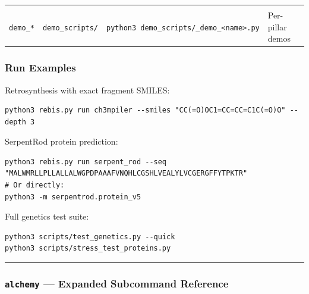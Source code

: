 \documentclass[12pt,a4paper]{article}
\begin{document}
\begin{longtable}[]{@{}llll@{}}
\begin{minipage}[t]{0.28\columnwidth}
\end{minipage}\tabularnewline
\begin{minipage}[t]{0.17\columnwidth}\raggedright
\texttt{demo\_*}\strut
\end{minipage} & \begin{minipage}[t]{0.24\columnwidth}\raggedright
\texttt{demo\_scripts/}\strut
\end{minipage} & \begin{minipage}[t]{0.19\columnwidth}\raggedright
\texttt{python3\ demo\_scripts/\_demo\_\textless{}name\textgreater{}.py}\strut
\end{minipage} & \begin{minipage}[t]{0.28\columnwidth}\raggedright
Per-pillar demos\strut
\end{minipage}\tabularnewline
\bottomrule
\end{longtable}

\hypertarget{run-examples}{%
\subsubsection{Run Examples}\label{run-examples}}

Retrosynthesis with exact fragment SMILES:

\begin{verbatim}
python3 rebis.py run ch3mpiler --smiles "CC(=O)OC1=CC=CC=C1C(=O)O" --depth 3
\end{verbatim}

SerpentRod protein prediction:

\begin{verbatim}
python3 rebis.py run serpent_rod --seq "MALWMRLLPLLALLALWGPDPAAAFVNQHLCGSHLVEALYLVCGERGFFYTPKTR"
# Or directly:
python3 -m serpentrod.protein_v5
\end{verbatim}

Full genetics test suite:

\begin{verbatim}
python3 scripts/test_genetics.py --quick
python3 scripts/stress_test_proteins.py
\end{verbatim}

\begin{center}\rule{0.5\linewidth}{0.5pt}\end{center}

\hypertarget{alchemy-expanded-subcommand-reference}{%
\subsubsection{\texorpdfstring{\texttt{alchemy} --- Expanded Subcommand
Reference}{alchemy --- Expanded Subcommand Reference}}\label{alchemy-expanded-subcommand-reference}}
\end{document}
